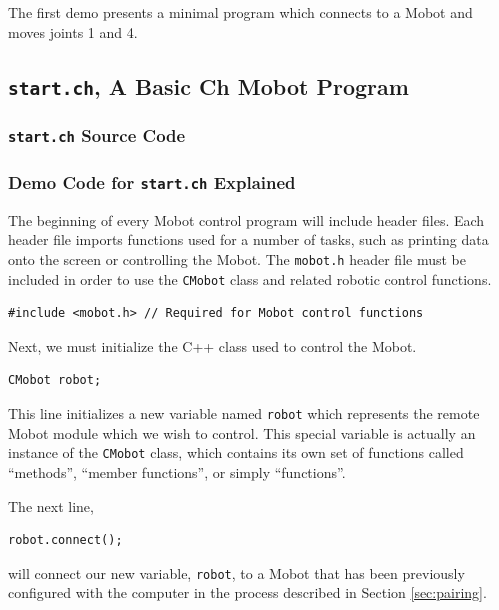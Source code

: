 \documentclass{article}
\begin{document}
The first demo presents a minimal program which connects to a Mobot and
moves joints 1 and 4.

\subsection{\texttt{start.ch}, A Basic Ch Mobot Program}
\subsubsection{\texttt{start.ch} Source Code}


\subsubsection{\label{sec:democode}Demo Code for \texttt{start.ch} Explained}
The beginning of every Mobot control program will include header files. Each
header file imports functions used for a number of tasks, such as printing
data onto the screen or controlling the Mobot. The \texttt{mobot.h} header
file must be included in order to use the \texttt{CMobot} class and related
robotic control functions.

\begin{verbatim}
#include <mobot.h> // Required for Mobot control functions
\end{verbatim}

Next, we must initialize the C++ class used to control the Mobot. 

\begin{verbatim}
CMobot robot;
\end{verbatim}

This line
initializes a new variable named \texttt{robot} which represents the remote
Mobot module which we wish to control. This special variable is actually an
instance of the \texttt{CMobot} class, which contains its own set of
functions called ``methods'', ``member functions'', or simply ``functions''.

The next line,
\begin{verbatim}
robot.connect();
\end{verbatim}
will connect our new variable, \texttt{robot}, to a
Mobot that has been previously configured with the computer in the 
process described in Section \ref{sec:pairing}.
\end{document}
